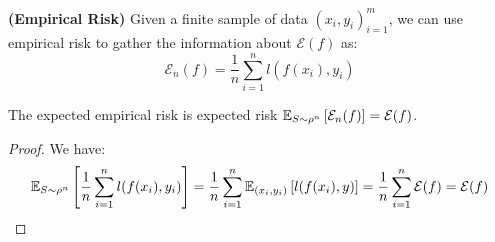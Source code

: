 \begin{definition}{\textbf{(Empirical Risk)}}
    Given a finite sample of data $(x_i, y_i)^m_{i=1}$, we can use empirical risk to gather the information about $\mathcal{E}(f)$ as:
    \begin{equation*}
        \mathcal{E}_n(f) = \frac{1}{n}\sum^n_{i=1}l(f(x_i), y_i)
    \end{equation*}
\end{definition}

\begin{proposition}
    The expected empirical risk is expected risk $\mathbb{E}_{S\sim\rho^n}\left[ \mathcal{E}_n(f) \right] = \mathcal{E}(f)$. 
\end{proposition}
\begin{proof}
    We have:
    \begin{equation*}
    \begin{aligned}
        \mathbb{E}_{S\sim\rho^n}\left[ \frac{1}{n}\sum^n_{i=1}l(f(x_i), y_i) \right] = \frac{1}{n}\sum^n_{i=1}\mathbb{E}_{(x_i, y_i)}\left[ l(f(x_i), y) \right] = \frac{1}{n}\sum^n_{i=1}\mathcal{E}(f) = \mathcal{E}(f)
    \end{aligned}
    \end{equation*}
\end{proof}

